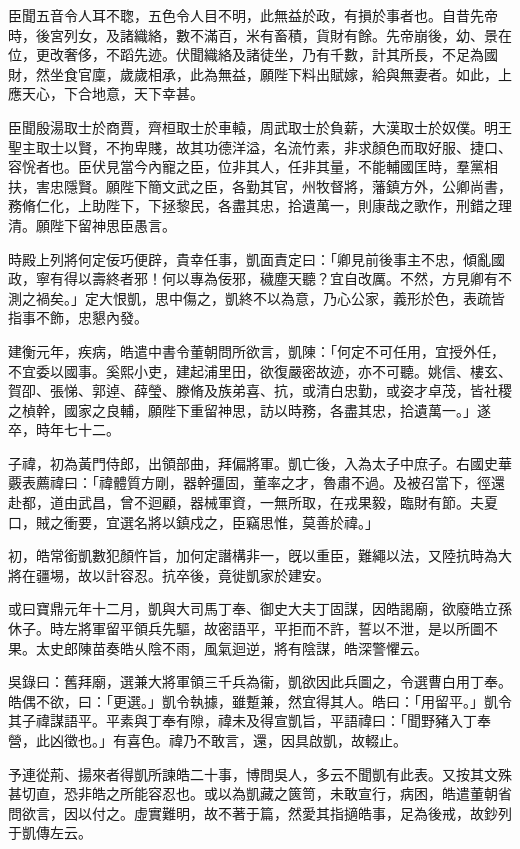 \begin{pinyinscope}
臣聞五音令人耳不聦，五色令人目不明，此無益於政，有損於事者也。自昔先帝時，後宮列女，及諸織絡，數不滿百，米有畜積，貨財有餘。先帝崩後，幼、景在位，更改奢侈，不蹈先迹。伏聞織絡及諸徒坐，乃有千數，計其所長，不足為國財，然坐食官廩，歲歲相承，此為無益，願陛下料出賦嫁，給與無妻者。如此，上應天心，下合地意，天下幸甚。

臣聞殷湯取士於商賈，齊桓取士於車轅，周武取士於負薪，大漢取士於奴僕。明王聖主取士以賢，不拘卑賤，故其功德洋溢，名流竹素，非求顏色而取好服、捷口、容恱者也。臣伏見當今內寵之臣，位非其人，任非其量，不能輔國匡時，羣黨相扶，害忠隱賢。願陛下簡文武之臣，各勤其官，州牧督將，藩鎮方外，公卿尚書，務脩仁化，上助陛下，下拯黎民，各盡其忠，拾遺萬一，則康哉之歌作，刑錯之理清。願陛下留神思臣愚言。

時殿上列將何定佞巧便辟，貴幸任事，凱面責定曰：「卿見前後事主不忠，傾亂國政，寧有得以壽終者邪！何以專為佞邪，穢塵天聽？宜自改厲。不然，方見卿有不測之禍矣。」定大恨凱，思中傷之，凱終不以為意，乃心公家，義形於色，表疏皆指事不飾，忠懇內發。

建衡元年，疾病，皓遣中書令董朝問所欲言，凱陳：「何定不可任用，宜授外任，不宜委以國事。奚熙小吏，建起浦里田，欲復嚴密故迹，亦不可聽。姚信、樓玄、賀卲、張悌、郭逴、薛瑩、滕脩及族弟喜、抗，或清白忠勤，或姿才卓茂，皆社稷之楨幹，國家之良輔，願陛下重留神思，訪以時務，各盡其忠，拾遺萬一。」遂卒，時年七十二。

子禕，初為黃門侍郎，出領部曲，拜偏將軍。凱亡後，入為太子中庶子。右國史華覈表薦禕曰：「禕體質方剛，器幹彊固，董率之才，魯肅不過。及被召當下，徑還赴都，道由武昌，曾不迴顧，器械軍資，一無所取，在戎果毅，臨財有節。夫夏口，賊之衝要，宜選名將以鎮戍之，臣竊思惟，莫善於禕。」

初，皓常銜凱數犯顏忤旨，加何定譖構非一，旣以重臣，難繩以法，又陸抗時為大將在疆埸，故以計容忍。抗卒後，竟徙凱家於建安。

或曰寶鼎元年十二月，凱與大司馬丁奉、御史大夫丁固謀，因皓謁廟，欲廢皓立孫休子。時左將軍留平領兵先驅，故密語平，平拒而不許，誓以不泄，是以所圖不果。太史郎陳苗奏皓乆陰不雨，風氣迴逆，將有陰謀，皓深警懼云。

吳錄曰：舊拜廟，選兼大將軍領三千兵為衞，凱欲因此兵圖之，令選曹白用丁奉。皓偶不欲，曰：「更選。」凱令執據，雖蹔兼，然宜得其人。皓曰：「用留平。」凱令其子禕謀語平。平素與丁奉有隙，禕未及得宣凱旨，平語禕曰：「聞野豬入丁奉營，此凶徵也。」有喜色。禕乃不敢言，還，因具啟凱，故輟止。

予連從荊、揚來者得凱所諫皓二十事，博問吳人，多云不聞凱有此表。又按其文殊甚切直，恐非皓之所能容忍也。或以為凱藏之篋笥，未敢宣行，病困，皓遣董朝省問欲言，因以付之。虛實難明，故不著于篇，然愛其指擿皓事，足為後戒，故鈔列于凱傳左云。


\end{pinyinscope}
